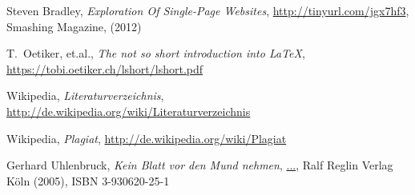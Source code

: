 
\begin{thebibliography}{99}

%
 Steven Bradley,
\emph{Exploration Of Single-Page Websites},
\url{http://tinyurl.com/jgx7hf3},
Smashing Magazine, (2012)

%
 T.~Oetiker, et.al., 
\emph{The not so short introduction into LaTeX}, \\
\url{https://tobi.oetiker.ch/lshort/lshort.pdf}

%
 Wikipedia, 
\emph{Literaturverzeichnis}, \\
\url{http://de.wikipedia.org/wiki/Literaturverzeichnis}

%
 Wikipedia, 
\emph{Plagiat}, 
\url{http://de.wikipedia.org/wiki/Plagiat}

%
 Gerhard Uhlenbruck, 
\emph{Kein Blatt vor den Mund nehmen}, 
\url{...}, Ralf Reglin Verlag Köln (2005), ISBN 3-930620-25-1

\end{thebibliography} 



